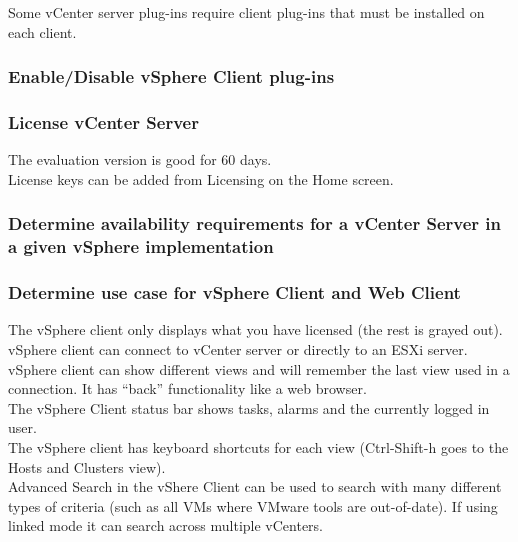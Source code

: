 Some vCenter server plug-ins require client plug-ins that must be installed
on each client.

\subsubsection{Enable/Disable vSphere Client plug-ins}

\subsubsection{License vCenter Server}

The evaluation version is good for 60 days.\\

License keys can be added from Licensing on the Home screen.

\subsubsection{Determine availability requirements for a vCenter Server in a given vSphere implementation}

\subsubsection{Determine use case for vSphere Client and Web Client}

The vSphere client only displays what you have licensed (the rest is grayed
out).\\

vSphere client can connect to vCenter server or directly to an ESXi server.\\

vSphere client can show different views and will remember the last view used
in a connection. It has ``back'' functionality like a web browser.\\

The vSphere Client status bar shows tasks, alarms and the currently logged in
user.\\

The vSphere client has keyboard shortcuts for each view (Ctrl-Shift-h goes to
the Hosts and Clusters view).\\

Advanced Search in the vShere Client can be used to search with many different
types of criteria (such as all VMs where VMware tools are out-of-date). If
using linked mode it can search across multiple vCenters.\\

